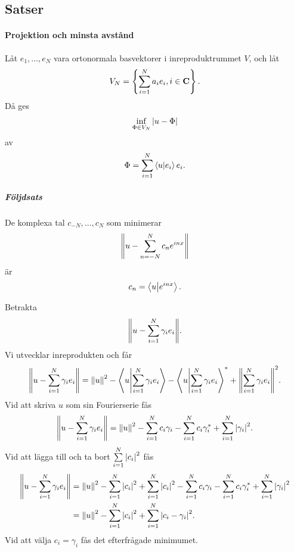 \subsection{Satser}

\paragraph{Projektion och minsta avstånd}
Låt $e_{1}, \dots, e_{N}$ vara ortonormala basvektorer i inreproduktrummet $V$, och låt
\begin{align*}
	V_{N} = \left\{\sum\limits_{i = 1}^{N}a_{i}e_{i}, i\in\mathbf{C}\right\}.
\end{align*}
Då ges
\begin{align*}
	\inf\limits_{\Phi\in V_{N}}\abs{u - \Phi}
\end{align*}
av
\begin{align*}
	\Phi = \sum\limits_{i = 1}^{N}\bra{u}\ket{e_{i}}e_{i}.
\end{align*}

\proof

\subparagraph{Följdsats}
De komplexa tal $c_{-N}, \dots, c_{N}$ som minimerar
\begin{align*}
	\norm{u - \sum\limits_{n = -N}^{N}c_{n}e^{inx}}
\end{align*}
är
\begin{align*}
	c_{n} = \bra{u}\ket{e^{inx}}.
\end{align*}

\proof
Betrakta
\begin{align*}
	\norm{u - \sum\limits_{i = 1}^{N}\gamma_{i}e_{i}}.
\end{align*}
Vi utvecklar inreprodukten och får
\begin{align*}
	\norm{u - \sum\limits_{i = 1}^{N}\gamma_{i}e_{i}} = \norm{u}^{2} - \bra{u}\ket{\sum\limits_{i = 1}^{N}\gamma_{i}e_{i}} - \bra{u}\ket{\sum\limits_{i = 1}^{N}\gamma_{i}e_{i}}^{*} + \norm{\sum\limits_{i = 1}^{N}\gamma_{i}e_{i}}^{2}.
\end{align*}
Vid att skriva $u$ som sin Fourierserie fås
\begin{align*}
	\norm{u - \sum\limits_{i = 1}^{N}\gamma_{i}e_{i}} = \norm{u}^{2} - \sum\limits_{i = 1}^{N}c_{i}\gamma_{i} - \sum\limits_{i = 1}^{N}c_{i}\gamma_{i}^{*} + \sum\limits_{i = 1}^{N}\abs{\gamma_{i}}^{2}.
\end{align*}
Vid att lägga till och ta bort $\sum\limits_{i = 1}^{N}\abs{c_{i}}^{2}$ fås
\begin{align*}
	\norm{u - \sum\limits_{i = 1}^{N}\gamma_{i}e_{i}} &= \norm{u}^{2} - \sum\limits_{i = 1}^{N}\abs{c_{i}}^{2} + \sum\limits_{i = 1}^{N}\abs{c_{i}}^{2} - \sum\limits_{i = 1}^{N}c_{i}\gamma_{i} - \sum\limits_{i = 1}^{N}c_{i}\gamma_{i}^{*} + \sum\limits_{i = 1}^{N}\abs{\gamma_{i}}^{2} \\
	                                                 &= \norm{u}^{2} - \sum\limits_{i = 1}^{N}\abs{c_{i}}^{2} + \sum\limits_{i = 1}^{N}\abs{c_{i} - \gamma_{i}}^{2}.
\end{align*}
Vid att välja $c_{i} = \gamma_{i}$ fås det efterfrågade minimumet.

